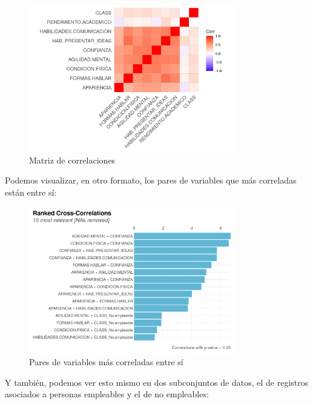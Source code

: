 \documentclass[11pt]{article}
\begin{document}
\begin{figure}[H]
    \centering
    \includegraphics[width=0.8\textwidth]{matriz_correlaciones}
    \caption{Matriz de correlaciones}
\end{figure}

Podemos visualizar, en otro formato, los pares de variables que más correladas están entre sí:

\begin{figure}[H]
    \centering
    \includegraphics[width=0.8\textwidth]{rank_correlaciones}
    \caption{Pares de variables más correladas entre sí}
\end{figure}

Y también, podemos ver esto mismo en dos subconjuntos de datos, el de registros asociados a personas empleables y el de no empleables:
\end{document}
